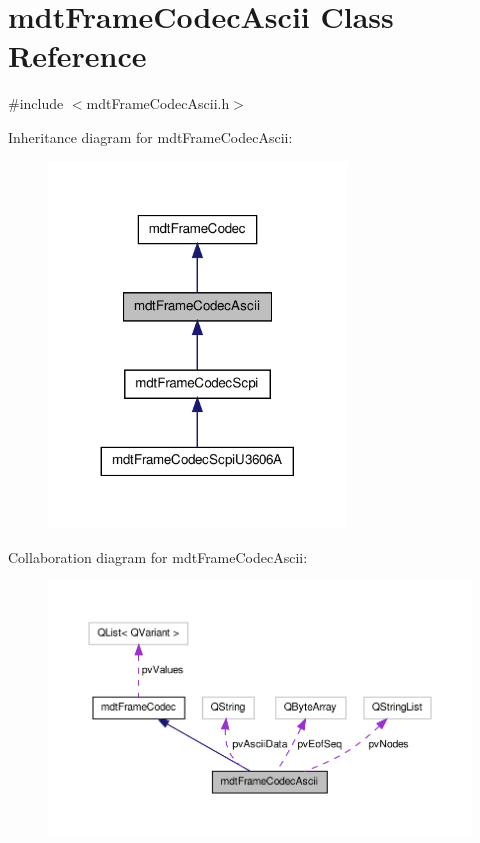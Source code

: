 \hypertarget{classmdt_frame_codec_ascii}{\section{mdt\-Frame\-Codec\-Ascii Class Reference}
\label{classmdt_frame_codec_ascii}
}


{\ttfamily \#include $<$mdt\-Frame\-Codec\-Ascii.\-h$>$}



Inheritance diagram for mdt\-Frame\-Codec\-Ascii\-:\nopagebreak
\begin{figure}[H]
\begin{center}
\leavevmode
\includegraphics[width=224pt]{classmdt_frame_codec_ascii__inherit__graph}
\end{center}
\end{figure}


Collaboration diagram for mdt\-Frame\-Codec\-Ascii\-:\nopagebreak
\begin{figure}[H]
\begin{center}
\leavevmode
\includegraphics[width=350pt]{classmdt_frame_codec_ascii__coll__graph}
\end{center}
\end{figure}
